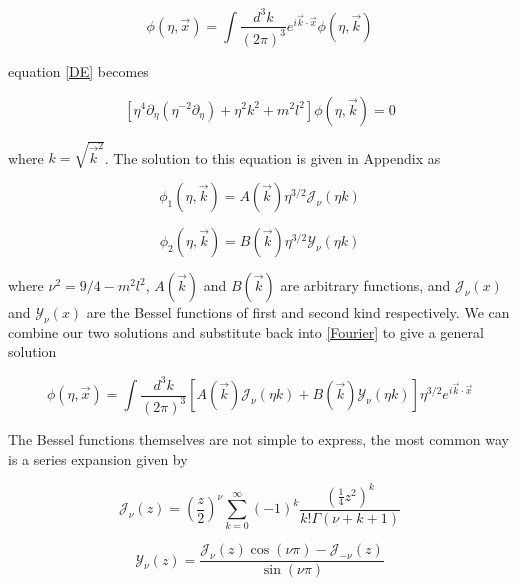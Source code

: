 \documentclass[a4paper,11pt]{article}
\numberwithin{equation}{section}
\numberwithin{figure}{section}
\begin{document}
\begin{large}
\begin{equation}
\label{Fourier}    
    \phi(\eta,\Vec{x})=\int \frac{d^3k}{(2\pi)^3}e^{i\Vec{k}\cdot\Vec{x}}\phi(\eta,\Vec{k})
\end{equation}


 equation \eqref{DE} becomes

\begin{equation}
\label{DEFT}    
    [\eta^4\partial_\eta(\eta^{-2}\partial_\eta)+\eta^2k^2+m^2l^2]\phi(\eta,\Vec{k})=0
\end{equation}

where $k=\sqrt{\Vec{k}^2}$. The solution to this equation is given in Appendix as

\begin{equation}
\label{phi1}    
    \phi_1(\eta,\Vec{k})=A(\Vec{k})\eta^{3/2}\mathcal{J}_\nu (\eta k)
\end{equation}

\begin{equation}
\label{phi2}
    \phi_2(\eta,\Vec{k})=B(\Vec{k})\eta^{3/2}\mathcal{Y}_\nu (\eta k)
\end{equation}

where $\nu^2=9/4-m^2l^2$, $A(\Vec{k})$ and $B(\Vec{k})$ are arbitrary functions, and $\mathcal{J}_\nu(x)$ and $\mathcal{Y}_\nu(x)$ are the Bessel functions of first and second kind respectively. We can combine our two solutions and substitute back into \eqref{Fourier} to give a general solution  

\begin{equation}
\label{genKGsol}    
    \phi(\eta,\Vec{x})= \int \frac{d^3k}{(2\pi)^3}\left[A(\Vec{k})\mathcal{J}_\nu (\eta k)+ B(\Vec{k})\mathcal{Y}_\nu (\eta k) \right]\eta^{3/2}e^{i \Vec{k}\cdot\Vec{x}}
\end{equation}

\newpage

The Bessel functions themselves are not simple to express, the most common way is a series expansion given by

\begin{equation}
\label{J(z)}    
    \mathcal{J}_\nu(z)=\left(\frac{z}{2}\right)^\nu \sum\limits_{k=0}^\infty (-1)^k \frac{(\frac{1}{4}z^2)^k}{k! \Gamma (\nu+k+1)}
\end{equation}

\vspace{0.5cm}

\begin{equation}
\label{Y(z)}    
    \mathcal{Y}_\nu(z)=\frac{\mathcal{J}_\nu(z)\cos(\nu\pi)-\mathcal{J}_{-\nu}(z)}{\sin(\nu\pi)}
\end{equation}


\end{large}
\end{document}
